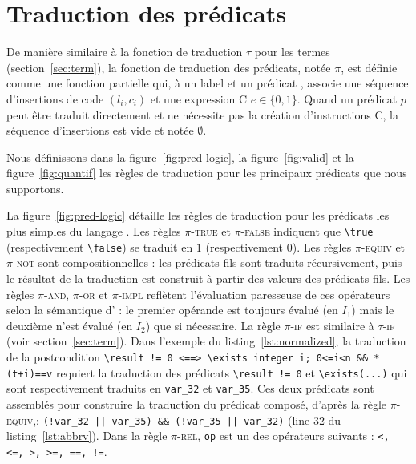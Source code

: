 \section{Traduction des prédicats \eacsl}
\label{sec:pred}


De manière similaire à la fonction de traduction $\tau$ pour les termes
(section~\ref{sec:term}), la fonction de traduction des prédicats, notée $\pi$,
est définie comme une fonction partielle qui, à un label et un prédicat \eacsl,
associe une séquence d'insertions de code $(l_i, c_i)$ et une expression C
$e \in \{0, 1\}$.
Quand un prédicat $p$ peut être traduit directement et ne nécessite pas la
création d'instructions C, la séquence d'insertions est vide et notée
$\emptyset$.

Nous définissons dans la figure~\ref{fig:pred-logic}, la figure~\ref{fig:valid}
et la figure~\ref{fig:quantif} les règles de traduction pour les principaux
prédicats \eacsl que nous supportons.

La figure~\ref{fig:pred-logic} détaille les règles de traduction pour les
prédicats les plus simples du langage \eacsl.
Les règles \textsc{$\pi$-true} et \textsc{$\pi$-false} indiquent que
\lstinline'\true' (respectivement \lstinline'\false') se traduit en $1$
(respectivement $0$).
Les règles \textsc{$\pi$-equiv} et \textsc{$\pi$-not} sont compositionnelles :
les prédicats fils sont traduits récursivement, puis le résultat de la
traduction est construit à partir des valeurs des prédicats fils.
Les règles \textsc{$\pi$-and}, \textsc{$\pi$-or} et \textsc{$\pi$-impl}
reflètent l'évaluation paresseuse de ces opérateurs selon la sémantique d'\eacsl
: le premier opérande est toujours évalué (en $I_1$) mais le deuxième n'est
évalué (en $I_2$) que si nécessaire.
La règle \textsc{$\pi$-if} est similaire à \textsc{$\tau$-if} (voir
section~\ref{sec:term}).
Dans l'exemple du listing~\ref{lst:normalized}, la traduction de la
postcondition
\lstinline{\result != 0 <==> \exists integer i; 0<=i<n && *(t+i)==v} requiert
la traduction des prédicats \lstinline|\result != 0| et
\lstinline{\exists(...)} qui sont respectivement traduits en \lstinline|var_32|
et \lstinline|var_35|.
Ces deux prédicats sont assemblés pour construire la traduction du prédicat
composé, d'après la règle \textsc{$\pi$-equiv},:
\lstinline{(!var_32 || var_35) && (!var_35 || var_32)} (line 32 du
listing~\ref{lst:abbrv}).
Dans la règle \textsc{$\pi$-rel}, \lstinline|op| est un des opérateurs suivants
: \lstinline[style=c]{<, <=, >, >=, ==, !=}.


